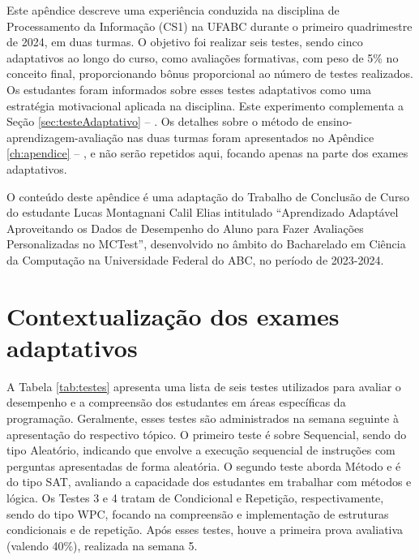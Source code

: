 \label{ch:apendiceB}

Este apêndice descreve uma experiência conduzida na disciplina de Processamento da Informação (CS1) na UFABC durante o primeiro quadrimestre de 2024, em duas turmas. O objetivo foi realizar seis testes, sendo cinco adaptativos ao longo do curso, como avaliações formativas, com peso de 5\% no conceito final, proporcionando bônus proporcional ao número de testes realizados. Os estudantes foram informados sobre esses testes adaptativos como uma estratégia motivacional aplicada na disciplina. Este experimento complementa a Seção \ref{sec:testeAdaptativo} -- . Os detalhes sobre o método de ensino-aprendizagem-avaliação nas duas turmas foram apresentados no Apêndice \ref{ch:apendice} -- , e não serão repetidos aqui, focando apenas na parte dos exames adaptativos.

O conteúdo deste apêndice é uma adaptação do Trabalho de Conclusão de Curso do estudante Lucas Montagnani Calil Elias intitulado ``Aprendizado Adaptável Aproveitando os Dados de Desempenho do Aluno para Fazer Avaliações Personalizadas no MCTest'', desenvolvido no âmbito do Bacharelado em Ciência da Computação na Universidade Federal do ABC, no período de 2023-2024.

\section{Contextualização dos exames adaptativos}


A Tabela \ref{tab:testes} apresenta uma lista de seis testes utilizados para avaliar o desempenho e a compreensão dos estudantes em áreas específicas da programação. Geralmente, esses testes são administrados na semana seguinte à apresentação do respectivo tópico. O primeiro teste é sobre Sequencial, sendo do tipo Aleatório, indicando que envolve a execução sequencial de instruções com perguntas apresentadas de forma aleatória. O segundo teste aborda Método e é do tipo SAT, avaliando a capacidade dos estudantes em trabalhar com métodos e lógica. Os Testes 3 e 4 tratam de Condicional e Repetição, respectivamente, sendo do tipo WPC, focando na compreensão e implementação de estruturas condicionais e de repetição. Após esses testes, houve a primeira prova avaliativa (valendo 40\%), realizada na semana 5. 

